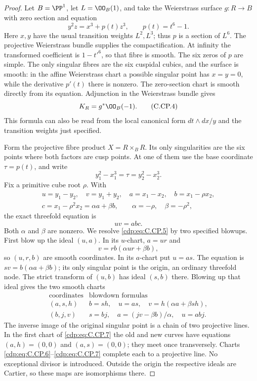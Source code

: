 \begin{proof}
Let $B=\PP^1$, let $L=\OO_B(1)$, and take the Weierstrass
surface $g:R\to B$ with zero section and equation
\[
                  y^2z=x^3+p(t)z^3,
             \qquad p(t)=t^6-1.                 \tag{C.CP.3}\label{cdp:eq:C.CP.3}
\]
Here $x,y$ have the usual transition weights $L^2,L^3$;
thus $p$ is a section of $L^6$. The projective Weierstrass
bundle supplies the compactification. At infinity the transformed
coefficient is $1-t'^6$, so that fibre is smooth. The six
zeros of $p$ are simple. The only singular fibres are the six
cuspidal cubics, and the surface is smooth: in the affine
Weierstrass chart a possible singular point has $x=y=0$, while
the derivative $p'(t)$ there is nonzero. The zero-section chart
is smooth directly from its equation. Adjunction in the
Weierstrass bundle gives
\[
                         K_R=g^*\OO_B(-1).
 \tag{C.CP.4}\label{cdp:eq:C.CP.4}
\]
This formula can also be read from the local canonical form
$dt\wedge dx/y$ and the transition weights just specified.

Form the projective fibre product $X=R\times_B R$. Its only
singularities are the six points where both factors are cusp
points. At one of them use the base coordinate $\tau=p(t)$,
and write
\[
 y_1^2-x_1^3=\tau=y_2^2-x_2^3.
\]
Fix a primitive cube root $\rho$. With
\[
 \begin{gathered}
 u=y_1-y_2,\quad v=y_1+y_2,\quad
 a=x_1-x_2,\quad b=x_1-\rho x_2,\\
 c=x_1-\rho^2x_2=\alpha a+\beta b,
 \qquad \alpha=-\rho,\quad\beta=-\rho^2,
 \end{gathered}
\]
the exact threefold equation is
\[
                         uv=abc.                \tag{C.CP.5}\label{cdp:eq:C.CP.5}
\]
Both $\alpha$ and $\beta$ are nonzero. We resolve \eqref{cdp:eq:C.CP.5}
by two specified blowups. First blow up the ideal $(u,a)$.
In its $u$-chart, $a=ur$ and
\[
                  v=rb(\alpha ur+\beta b),
 \tag{C.CP.6}\label{cdp:eq:C.CP.6}
\]
so $(u,r,b)$ are smooth coordinates. In its $a$-chart put
$u=as$. The equation is $sv=b(\alpha a+\beta b)$; its
only singular point is the origin, an ordinary threefold
node. The strict transform of $(u,b)$ has ideal $(s,b)$
there. Blowing up that ideal gives the two smooth charts
\[
 \begin{array}{c|c}
 \text{coordinates}&\text{blowdown formulas}\\ \hline
 (a,s,h)&b=sh,\quad u=as,\quad
                    v=h(\alpha a+\beta sh),\\
 (b,j,v)&s=bj,\quad a=(jv-\beta b)/\alpha,\quad u=abj.
 \end{array}                                    \tag{C.CP.7}\label{cdp:eq:C.CP.7}
\]
The inverse image of the original singular point is a chain
of two projective lines. In the first chart of \eqref{cdp:eq:C.CP.7}
the old and new curves have equations $(a,h)=(0,0)$
and $(a,s)=(0,0)$; they meet once transversely. Charts
\eqref{cdp:eq:C.CP.6}--\eqref{cdp:eq:C.CP.7} complete each to a projective line.
No exceptional divisor is introduced. Outside the origin
the respective ideals are Cartier, so these maps are
isomorphisms there.


\end{proof}
